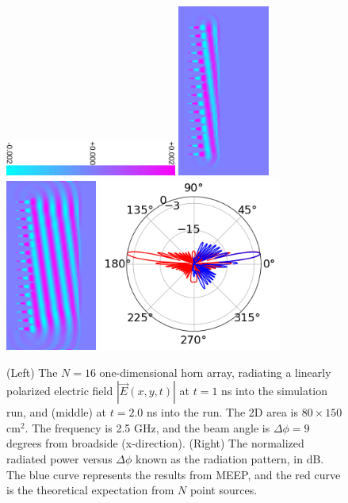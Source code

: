 \documentclass[../../main.tex]{subfiles}
\begin{document}
\begin{figure}
\centering
\includegraphics[width=5.625cm,angle=90]{figures/fields/colorbar.pdf}
\includegraphics[width=3cm]{figures/fields/ey_phase_horn_t30.png}
\includegraphics[width=3cm]{figures/fields/ey_phase_horn_t60.png}
\includegraphics[width=6cm]{figures/fields/rad_patt_field.png}
\caption{\label{fig:1dhornresults2} (Left) The $N = 16$ one-dimensional horn array, radiating a linearly polarized electric field $|\vec{E}(x,y,t)|$ at $t = 1$ ns into the simulation run, and (middle) at $t = 2.0$ ns into the run.  The 2D area is $80 \times 150$ cm$^2$.  The frequency is 2.5 GHz, and the beam angle is $\Delta \phi = 9$ degrees from broadside (x-direction). (Right) The normalized radiated power versus $\Delta \phi$ known as the radiation pattern, in dB.  The blue curve represents the results from MEEP, and the red curve is the theoretical expectation from $N$ point sources.}
\end{figure}
\end{document}
